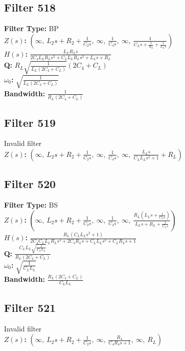 \documentclass{article}
\begin{document}
\subsection*{Filter 518}
\textbf{Filter Type:} BP \\ 
\textbf{$Z(s)$:} $\left( \infty, \  L_{2} s + R_{2} + \frac{1}{C_{2} s}, \  \infty, \  \frac{1}{C_{4} s}, \  \infty, \  \frac{1}{C_{L} s + \frac{1}{R_{L}} + \frac{1}{L_{L} s}}\right)$ \\ 
\textbf{$H(s)$:} $\frac{L_{L} R_{L} s}{2 C_{4} L_{L} R_{L} s^{2} + C_{L} L_{L} R_{L} s^{2} + L_{L} s + R_{L}}$ \\ 
\textbf{Q:} $R_{L} \sqrt{\frac{1}{L_{L} \left(2 C_{4} + C_{L}\right)}} \left(2 C_{4} + C_{L}\right)$ \\ 
\textbf{$\omega_0$:} $\sqrt{\frac{1}{L_{L} \left(2 C_{4} + C_{L}\right)}}$ \\ 
\textbf{Bandwidth:} $\frac{1}{R_{L} \left(2 C_{4} + C_{L}\right)}$ \\ 
\subsection*{Filter 519}
Invalid filter \\ 
\textbf{$Z(s)$:} $\left( \infty, \  L_{2} s + R_{2} + \frac{1}{C_{2} s}, \  \infty, \  \frac{1}{C_{4} s}, \  \infty, \  \frac{L_{L} s}{C_{L} L_{L} s^{2} + 1} + R_{L}\right)$ \\ 
\subsection*{Filter 520}
\textbf{Filter Type:} BS \\ 
\textbf{$Z(s)$:} $\left( \infty, \  L_{2} s + R_{2} + \frac{1}{C_{2} s}, \  \infty, \  \frac{1}{C_{4} s}, \  \infty, \  \frac{R_{L} \left(L_{L} s + \frac{1}{C_{L} s}\right)}{L_{L} s + R_{L} + \frac{1}{C_{L} s}}\right)$ \\ 
\textbf{$H(s)$:} $\frac{R_{L} \left(C_{L} L_{L} s^{2} + 1\right)}{2 C_{4} C_{L} L_{L} R_{L} s^{3} + 2 C_{4} R_{L} s + C_{L} L_{L} s^{2} + C_{L} R_{L} s + 1}$ \\ 
\textbf{Q:} $\frac{C_{L} L_{L} \sqrt{\frac{1}{C_{L} L_{L}}}}{R_{L} \left(2 C_{4} + C_{L}\right)}$ \\ 
\textbf{$\omega_0$:} $\sqrt{\frac{1}{C_{L} L_{L}}}$ \\ 
\textbf{Bandwidth:} $\frac{R_{L} \left(2 C_{4} + C_{L}\right)}{C_{L} L_{L}}$ \\ 
\subsection*{Filter 521}
Invalid filter \\ 
\textbf{$Z(s)$:} $\left( \infty, \  L_{2} s + R_{2} + \frac{1}{C_{2} s}, \  \infty, \  \frac{R_{4}}{C_{4} R_{4} s + 1}, \  \infty, \  R_{L}\right)$ \\ 
\end{document}
